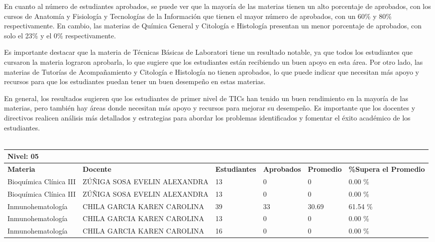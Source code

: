En cuanto al número de estudiantes aprobados, se puede ver que la mayoría de las materias tienen un alto porcentaje de aprobados, con los cursos de Anatomía y Fisiología y Tecnologías de la Información que tienen el mayor número de aprobados, con un 60\% y 80\% respectivamente. En cambio, las materias de Química General y Citología e Histología presentan un menor porcentaje de aprobados, con solo el 23\% y el 0\% respectivamente.

Es importante destacar que la materia de Técnicas Básicas de Laboratori tiene un resultado notable, ya que todos los estudiantes que cursaron la materia lograron aprobarla, lo que sugiere que los estudiantes están recibiendo un buen apoyo en esta área. Por otro lado, las materias de Tutorías de Acompañamiento y Citología e Histología no tienen aprobados, lo que puede indicar que necesitan más apoyo y recursos para que los estudiantes puedan tener un buen desempeño en estas materias.

En general, los resultados sugieren que los estudiantes de primer nivel de TICs han tenido un buen rendimiento en la mayoría de las materias, pero también hay áreas donde necesitan más apoyo y recursos para mejorar su desempeño. Es importante que los docentes y directivos realicen análisis más detallados y estrategias para abordar los problemas identificados y fomentar el éxito académico de los estudiantes.\\
\vspace{1cm}\\\small
\begin{tabularx}{\textwidth}{|p{2.5cm}|p{2.5cm}|X|X|X|X|}
\hline
\multicolumn{6}{|X|}{\textbf{Nivel: 05 }}\\\hline\textbf{Materia} & \textbf{Docente} & \textbf{Estudiantes} & \textbf{Aprobados} & \textbf{Promedio} & \textbf{\%Supera el Promedio} \\ \hline
Bioquímica Clínica III & ZÚÑIGA SOSA EVELIN ALEXANDRA & 13 & 0 & 0 & 0.00 \%\\ \hline
Bioquímica Clínica III & ZÚÑIGA SOSA EVELIN ALEXANDRA & 13 & 0 & 0 & 0.00 \%\\ \hline
Inmunohematología & CHILA GARCIA KAREN CAROLINA & 39 & 33 & 30.69 & 61.54 \%\\ \hline
Inmunohematología & CHILA GARCIA KAREN CAROLINA & 13 & 0 & 0 & 0.00 \%\\ \hline
Inmunohematología & CHILA GARCIA KAREN CAROLINA & 16 & 0 & 0 & 0.00 \%\\ \hline
\end{tabularx}


